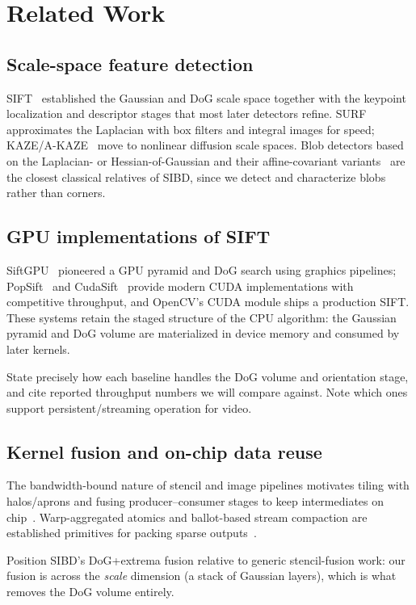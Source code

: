 \section{Related Work}
\label{sec:related}

\subsection{Scale-space feature detection}
SIFT~\cite{lowe2004} established the Gaussian and DoG scale space together with
the keypoint localization and descriptor stages that most later detectors
refine. SURF~\cite{surf} approximates the Laplacian
with box filters and integral images for speed; KAZE/A-KAZE~\cite{kaze} move to
nonlinear diffusion scale spaces. Blob detectors based on the Laplacian- or
Hessian-of-Gaussian and their affine-covariant variants~\cite{mikolajczyk2005}
are the closest classical relatives of SIBD, since we detect and characterize
blobs rather than corners.

\subsection{GPU implementations of SIFT}
SiftGPU~\cite{siftgpu} pioneered a GPU pyramid and DoG search using graphics
pipelines; PopSift~\cite{popsift} and CudaSift~\cite{cudasift} provide modern
CUDA implementations with competitive throughput, and OpenCV's CUDA module
ships a production SIFT. These systems retain the staged structure of the CPU
algorithm: the Gaussian pyramid and DoG volume are materialized in device
memory and consumed by later kernels.
\begin{fillbox}
State precisely how each baseline handles the DoG volume and orientation stage,
and cite reported throughput numbers we will compare against. Note which ones
support persistent/streaming operation for video.
\end{fillbox}

\subsection{Kernel fusion and on-chip data reuse}
The bandwidth-bound nature of stencil and image pipelines motivates tiling with
halos/aprons and fusing producer--consumer stages to keep intermediates on
chip~\cite{halide,micikevicius_stencil}. Warp-aggregated atomics and ballot-based
stream compaction are established primitives for packing sparse
outputs~\cite{cuda_warpagg}.
\begin{fillbox}
Position SIBD's DoG+extrema fusion relative to generic stencil-fusion work:
our fusion is across the \emph{scale} dimension (a stack of Gaussian layers),
which is what removes the DoG volume entirely.
\end{fillbox}

